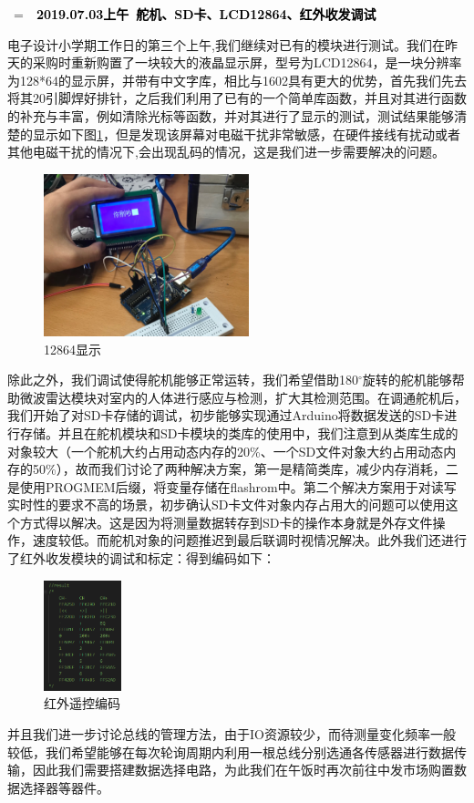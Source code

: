 \documentclass[a4paper, 11pt]{article} %
\makeatletter
\newlength\sidebar
\newlength\envborder
\def\esefcolorbox#1#{\esecolor@fbox{#1}}
\def\esecolor@fbox#1#2#3{%
   \color@b@x{\fboxsep\z@\color#1{#2}\fboxs}{\color#1{#3}}}
\newenvironment{eseframed}{%
   \def\FrameCommand{\fboxrule=\the\sidebar  \fboxsep=\the\envborder%
   \esefcolorbox{exampleborder}{examplebg}}%
   \MakeFramed{\FrameRestore}}%
  {\endMakeFramed}
\newcounter{diary}
\newenvironment{diary}[2]
 {\par\medskip\refstepcounter{diary}%
 \hbox{%
 \fboxsep=\the\sidebar\hspace{-\envborder}\hspace{-0.5\sidebar}%
 \colorbox{exampleborder}{%
 \hspace{\envborder}\footnotesize\sffamily\bfseries%
 \textcolor{black}{{#1}\ {#2}\enspace\hspace{\envborder}}
 }
 }
 \nointerlineskip\vspace{-\topsep}%
 \begin{eseframed}\noindent\ignorespaces%
 }
 {\end{eseframed}\vspace{-\baselineskip}\medskip}
\makeatother
\begin{document}
  
  \begin{diary}{2019.07.03上午}{舵机、SD卡、LCD12864、红外收发调试}
    
  电子设计小学期工作日的第三个上午,我们继续对已有的模块进行测试。我们在昨天的采购时重新购置了一块较大的液晶显示屏，型号为LCD12864，是一块分辨率为128*64的显示屏，并带有中文字库，相比与1602具有更大的优势，首先我们先去将其20引脚焊好排针，之后我们利用了已有的一个简单库函数，并且对其进行函数的补充与丰富，例如清除光标等函数，并对其进行了显示的测试，测试结果能够清楚的显示如下图\ref{img2}，但是发现该屏幕对电磁干扰非常敏感，在硬件接线有扰动或者其他电磁干扰的情况下,会出现乱码的情况，这是我们进一步需要解决的问题。
  \begin{figure}[H]
    \centering
    \includegraphics[width = 0.53\textwidth]{12864.jpg}
    \caption{12864显示}
    \label{img2}
  \end{figure}
  
  除此之外，我们调试使得舵机能够正常运转，我们希望借助180$^{\circ}$旋转的舵机能够帮助微波雷达模块对室内的人体进行感应与检测，扩大其检测范围。在调通舵机后，我们开始了对SD卡存储的调试，初步能够实现通过Arduino将数据发送的SD卡进行存储。并且在舵机模块和SD卡模块的类库的使用中，我们注意到从类库生成的对象较大（一个舵机大约占用动态内存的20\%、一个SD文件对象大约占用动态内存的50\%），故而我们讨论了两种解决方案，第一是精简类库，减少内存消耗，二是使用PROGMEM后缀，将变量存储在flashrom中。第二个解决方案用于对读写实时性的要求不高的场景，初步确认SD卡文件对象内存占用大的问题可以使用这个方式得以解决。这是因为将测量数据转存到SD卡的操作本身就是外存文件操作，速度较低。而舵机对象的问题推迟到最后联调时视情况解决。此外我们还进行了红外收发模块的调试和标定：得到编码如下：
  
  \begin{figure}[H]
    \centering
    \includegraphics[width = 0.2\textwidth]{controller_code.png}
    \caption{红外遥控编码}
  \end{figure}
  
  并且我们进一步讨论总线的管理方法，由于IO资源较少，而待测量变化频率一般较低，我们希望能够在每次轮询周期内利用一根总线分别选通各传感器进行数据传输，因此我们需要搭建数据选择电路，为此我们在午饭时再次前往中发市场购置数据选择器等器件。
  
  \end{diary}
  
\end{document}

